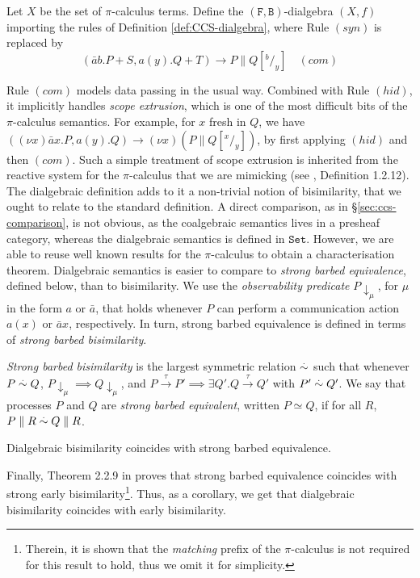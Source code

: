 \documentclass[orivec]{llncs}
\newcommand{\mC}[1]{\mathtt{#1}}
\newcommand{\mF}[1]{\mathtt{#1}}
\newcommand{\Set}{\mC{Set}}
\newcommand{\F}{\mF{F}}
\newcommand{\B}{\mF{B}}
\newcommand{\tr}[1]{\stackrel{#1}{\longrightarrow}}
\newcommand{\utr}{\to}
\newcommand{\sbb}{\stackrel{\ldotp}{\sim}}
\newcommand{\sbe}{\simeq}
\newcommand{\defend}{}
\renewenvironment{definition}{\begin{defn}}{\defend\end{defn}}
\renewenvironment{theorem}{\begin{thm}}{\defend\end{thm}}
\begin{document}
\begin{definition}
Let $X$ be the set of $\pi$-calculus terms. Define the $(\F,\B)$-dialgebra $(X,f)$ importing the rules of Definition \ref{def:CCS-dialgebra}, where Rule $(syn)$ is replaced by 
$$
	{(\bar ab.P + S,a(y).Q + T) \utr P \parallel Q[{}^b/_y]}\quad(com)$$
\end{definition}
Rule $(com)$ models data passing in the usual way. Combined with Rule $(hid)$, it implicitly handles \emph{scope extrusion}, which is one of the most difficult bits of the $\pi$-calculus semantics. For example, for $x$ fresh in $Q$, we have $((\nu x) \bar a x . P, a(y).Q)\utr (\nu x)(P \parallel Q[{}^x/_y])$, by first applying $(hid)$ and then $(com)$. Such a simple treatment of scope extrusion is inherited from the reactive system for the $\pi$-calculus that we are mimicking (see \cite{San01}, Definition 1.2.12). The dialgebraic definition adds to it a non-trivial notion of bisimilarity, that we ought to relate to the standard definition. A direct comparison, as in \S \ref{sec:ccs-comparison}, is not obvious, as the coalgebraic semantics lives in a presheaf category, whereas the dialgebraic semantics is defined in $\Set$. However, we are able to reuse well known results for the $\pi$-calculus to obtain a characterisation theorem. Dialgebraic semantics is easier to compare to \emph{strong barbed equivalence}, defined below, than to bisimilarity. We use the \emph{observability predicate} $P\downarrow _\mu$, for $\mu$ in the form $a$ or $\bar a$, that holds whenever $P$ can perform a communication action $a(x)$ or $\bar a x$, respectively. In turn, strong barbed equivalence is defined in terms of \emph{strong barbed bisimilarity}.

\begin{definition}\label{def:pi-strong-barbed}
\emph{Strong barbed bisimilarity} is the largest symmetric relation $\sbb$ such that whenever $P \sbb Q$, $P \downarrow_\mu \implies Q \downarrow_\mu$, and $P \tr{\tau} P' \implies \exists Q' . Q \tr{\tau} Q'$ with $P' \sbb Q'$. 
We say that processes $P$ and $Q$ are \emph{strong barbed equivalent}, written $P \sbe Q$, if for all $R$, $P \parallel R \sbb Q \parallel R$.
\end{definition}


\begin{theorem}\label{thm:pi-calculus-characterization}
 Dialgebraic bisimilarity coincides with strong barbed equivalence.
\end{theorem}

Finally, Theorem 2.2.9 in \cite{San01} proves that strong barbed equivalence coincides with strong early bisimilarity\footnote{Therein, it is shown that the \emph{matching} prefix of the $\pi$-calculus is not required for this result to hold, thus we omit it for simplicity.}. Thus, as a corollary, we get that dialgebraic bisimilarity coincides with early bisimilarity.
\end{document}

